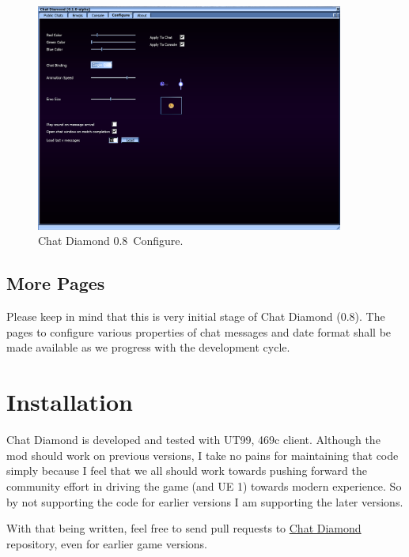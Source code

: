 \documentclass{article}
\theoremstyle{definition}
\newcommand{\ChatDiamondVersion}{0.8}
\begin{document}
\begin{figure}
\centering
\includegraphics[width=0.9\textwidth]{img_configure}
\caption{Chat Diamond \ChatDiamondVersion~Configure.}
\label{fig:chatdiamond_configure}
\end{figure}


\subsection{More Pages}
Please keep in mind that this is very initial stage of Chat Diamond (\ChatDiamondVersion).  The pages to configure various properties of chat messages
and date format shall be made available as we progress with the development cycle.


\section{Installation}
Chat Diamond is developed and tested with UT99, 469c client.  Although the mod should work on previous versions, I take no pains for maintaining that code simply because I feel that we all should work towards pushing forward the community effort in driving the game (and UE 1) towards modern experience.  So by not supporting the code for earlier versions I am supporting the later versions.

With that being written, feel free to send pull requests to \href{https://github.com/ravimohan1991/ChatDiamond/}{Chat Diamond} repository, even for earlier game versions.
\end{document}
